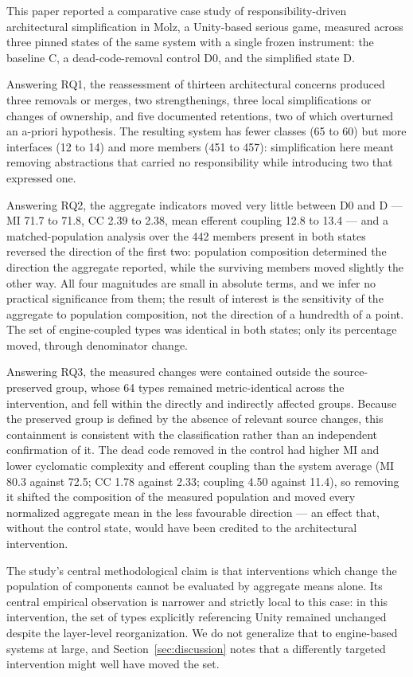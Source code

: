 \documentclass{sbc2019}%
\begin{document}
This paper reported a comparative case study of responsibility-driven
architectural simplification in Molz, a Unity-based serious game, measured across
three pinned states of the same system with a single frozen instrument: the
baseline C, a dead-code-removal control D0, and the simplified state D.

Answering RQ1, the reassessment of thirteen architectural concerns produced three
removals or merges, two strengthenings, three local simplifications or changes of
ownership, and five documented retentions, two of which overturned an a-priori
hypothesis. The resulting system has fewer classes
(65 to 60) but more interfaces (12 to 14) and more members (451 to 457):
simplification here meant removing abstractions that carried no responsibility
while introducing two that expressed one.

Answering RQ2, the aggregate indicators moved very little between D0 and D --- MI
71.7 to 71.8, CC 2.39 to 2.38, mean efferent coupling 12.8 to 13.4 --- and a
matched-population analysis over the 442 members present in both states reversed
the direction of the first two: population composition determined the direction
the aggregate reported, while the surviving members moved slightly the other way.
All four magnitudes are small in absolute terms, and we infer no practical
significance from them; the result of interest is the sensitivity of the
aggregate to population composition, not the direction of a hundredth of a
point. The set of engine-coupled types
was identical in both states; only its percentage moved, through denominator
change.

Answering RQ3, the measured changes were contained outside the source-preserved
group, whose 64 types remained metric-identical across the intervention, and fell
within the directly and indirectly affected groups. Because the preserved group is
defined by the absence of relevant source changes, this containment is consistent
with the classification rather than an independent confirmation of it. The dead
code removed in the control had higher MI and lower cyclomatic complexity and
efferent coupling than the system average (MI 80.3 against 72.5; CC 1.78 against
2.33; coupling 4.50 against 11.4), so removing it shifted the composition of the
measured population
and moved every normalized aggregate mean in the less favourable direction --- an
effect that, without the control state, would have been credited to the
architectural intervention.

The study's central methodological claim is that interventions which change the
population of components cannot be evaluated by aggregate means alone. Its
central empirical observation is narrower and strictly local to this case: in
this intervention, the set of types explicitly referencing Unity remained
unchanged despite the layer-level reorganization. We do not generalize that to
engine-based systems at large, and Section~\ref{sec:discussion} notes that a
differently targeted intervention might well have moved the set.
\end{document}
